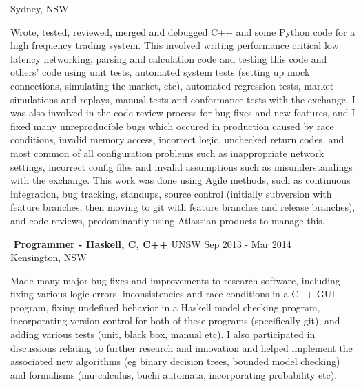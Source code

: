 \documentclass{res}
\begin{document}
\begin{resume}
\begin{tabbing}
                                   \>Sydney, NSW
   \end{tabbing}\vspace{-20pt}      %
    Wrote, tested, reviewed, merged and debugged C++ and some Python code for a
    high frequency trading system. This involved writing performance critical
    low latency networking, parsing and calculation code and testing this code
    and others' code using unit tests, automated system tests (setting up mock
    connections, simulating the market, etc), automated regression tests,
    market simulations and replays, manual tests and conformance tests with the
    exchange. I was also involved in the code review process for bug fixes and
    new features, and I fixed many unreproducible bugs which occured in
    production caused by race conditions, invalid memory access, incorrect
    logic, unchecked return codes, and most common of all configuration
    problems such as inappropriate network settings, incorrect config files and
    invalid assumptions such as misunderstandings with the exchange. This work
    was done using Agile methods, such as continuous integration, bug tracking,
    standups, source control (initially subversion with feature branches, then
    moving to git with feature branches and release branches), and code
    reviews, predominantly using Atlassian products to manage this.
   \begin{tabbing}
   \hspace{2.3in}\= \hspace{2.6in}\= \kill %
    {\bf Programmer - Haskell, C, C++} \>UNSW \>Sep 2013 - Mar 2014\\
                                       \>Kensington, NSW
   \end{tabbing}\vspace{-20pt}      %
    Made many major bug fixes and improvements to research software, including
    fixing various logic errors, inconsistencies and race conditions in a C++
    GUI program, fixing undefined behavior in a Haskell model checking program,
    incorporating version control for both of these programs (specifically
    git), and adding various tests (unit, black box, manual etc). I also
    participated in discussions relating to further research and innovation and
    helped implement the associated new algorithms (eg binary decision trees,
    bounded model checking) and formalisms (mu calculus, buchi automata,
    incorporating probability etc).

\end{resume}
\end{document}
